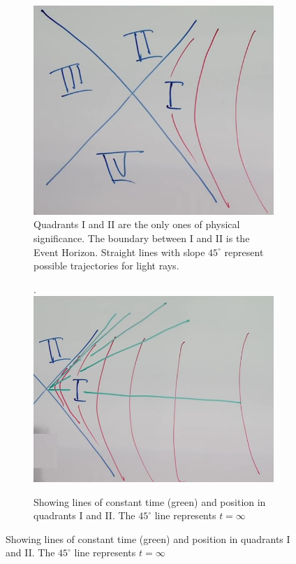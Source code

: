 \documentclass[]{article}
\begin{document}
{\begin{figure}[H]
	\caption{Near the event horizon}
	\begin{subfigure}[t]{0.45\textwidth}
			\caption[Event Horizon]{Quadrants I and II are the only ones of physical significance. The boundary between I and II is the Event Horizon. Straight lines with slope $45^\circ$  represent possible trajectories for light rays.}\label{fig:gr-8-4quadrants}
		\includegraphics[width=\textwidth]{gr-8-4quadrants}
	\end{subfigure}
	\begin{subfigure}[t]{0.45\textwidth}
		\caption[Event Horizon]{Showing lines of constant time (green) and position in quadrants I and II. The $45^\circ$ line represents $t=\infty$}.\label{fig:gr-8-2quadrants}
		\includegraphics[width=\textwidth]{gr-8-2quadrants}
	\end{subfigure}
\end{figure}

}
\end{document}
